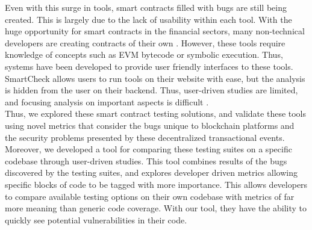 Even with this surge in tools, smart contracts filled with bugs are still being created. This is largely due to the lack of usability within each tool. With the huge opportunity for smart contracts in the financial sectors, many non-technical developers are creating contracts of their own \cite{tapscott2016blockchain}. However, these tools require knowledge of concepts such as EVM bytecode or symbolic execution. Thus, systems have been developed to provide user friendly interfaces to these tools. SmartCheck allows users to run tools on their website with ease, but the analysis is hidden from the user on their backend. Thus, user-driven studies are limited, and focusing analysis on important aspects is difficult \cite{smartcheck}. \\

Thus, we explored these smart contract testing solutions, and validate these tools using novel metrics that consider the bugs unique to blockchain platforms and the security problems presented by these decentralized transactional events. Moreover, we developed a tool for comparing these testing suites on a specific codebase through user-driven studies. This tool combines results of the bugs discovered by the testing suites, and explores developer driven metrics allowing specific blocks of code to be tagged with more importance. This allows developers to compare available testing options on their own codebase with metrics of far more meaning than generic code coverage. With our tool, they have the ability to quickly see potential vulnerabilities in their code. \\



